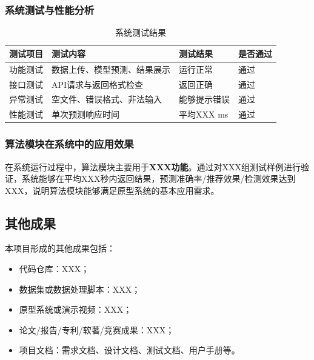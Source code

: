 \documentclass{style/course-report}
\begin{document}
\subsubsection{系统测试与性能分析}

\begin{table}[H]
    \centering
    \caption{系统测试结果}
    \begin{tabular}{llll}
        \toprule
        测试项目 & 测试内容 & 测试结果 & 是否通过 \\
        \midrule
        功能测试 & 数据上传、模型预测、结果展示 & 运行正常 & 通过 \\
        接口测试 & API请求与返回格式检查 & 返回正确 & 通过 \\
        异常测试 & 空文件、错误格式、非法输入 & 能够提示错误 & 通过 \\
        性能测试 & 单次预测响应时间 & 平均XXX ms & 通过 \\
        \bottomrule
    \end{tabular}
    \label{tab:system_test}
\end{table}

\subsubsection{算法模块在系统中的应用效果}

在系统运行过程中，算法模块主要用于\textbf{XXX功能}。通过对XXX组测试样例进行验证，系统能够在平均XXX秒内返回结果，预测准确率/推荐效果/检测效果达到XXX，说明算法模块能够满足原型系统的基本应用需求。

\subsection{其他成果}

本项目形成的其他成果包括：
\begin{itemize}
    \item 代码仓库：XXX；
    \item 数据集或数据处理脚本：XXX；
    \item 原型系统或演示视频：XXX；
    \item 论文/报告/专利/软著/竞赛成果：XXX；
    \item 项目文档：需求文档、设计文档、测试文档、用户手册等。
\end{itemize}
\end{document}
